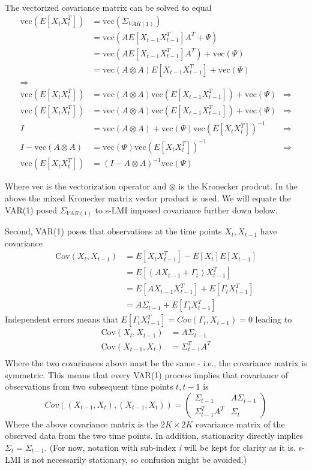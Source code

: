 \documentclass[
  letterpaper,
  DIV=11,
  numbers=noendperiod]{scrartcl}
\begin{document}
The vectorized covariance matrix can be solved to equal\\
\[
\begin{align*}
\text{vec}(E[X_tX_t^T])&=\text{vec}(\Sigma_{VAR(1)}) \\
&=\text{vec}(AE[X_{t-1}X_{t-1}^T]A^T + \Psi) \\
&=\text{vec}(AE[X_{t-1}X_{t-1}^T]A^T) + \text{vec}(\Psi) \\
&=\text{vec}(A\otimes A)E[X_{t-1}X_{t-1}^T]+\text{vec}(\Psi) \\
\Longrightarrow\\
\text{vec}(E[X_tX_t^T])&=\text{vec}(A\otimes A)\text{vec}(E[X_{t-1}X_{t-1}^T])+\text{vec}(\Psi)&\Rightarrow\\
\text{vec}(E[X_tX_t^T])&=\text{vec}(A\otimes A)\text{vec}(E[X_{t-1}X_{t-1}^T])+\text{vec}(\Psi)&\Rightarrow\\
I&=\text{vec}(A\otimes A)+\text{vec}(\Psi)\text{vec}(E[X_tX_t^T])^{-1}&\Rightarrow\\
I-\text{vec}(A\otimes A) &= \text{vec}(\Psi)\text{vec}(E[X_tX_t^T])^{-1}&\Rightarrow\\
\text{vec}(E[X_tX_t^T])&= (I-A \otimes A)^{-1} \text{vec}(\Psi)
\end{align*}
\]

Where vec is the vectorization operator and \(\otimes\) is the Kronecker
prodcut. In the above the mixed Kronecker matrix vector product is used.
We will equate the VAR(1) posed \(\Sigma_{VAR(1)}\) to s-LMI imposed
covariance further down below.

Second, VAR(1) poses that observations at the time points
\(X_t, X_{t-1}\) have covariance \[
\begin{align*}
\text{Cov}(X_t,X_{t-1})&=
E[X_tX_{t-1}^T]-E[X_t]E[X_{t-1}]\\&=
E[(AX_{t-1}+\Gamma_t)X_{t-1}^T]\\&=
E[AX_{t-1}X_{t-1}^T]+E[\Gamma_tX_{t-1}^T]\\&=
A\Sigma_{t-1}+E[\Gamma_tX_{t-1}^T]
\end{align*}
\] Independent errors means that
\(E[\Gamma_tX_{t-1}^T]=Cov(\Gamma_t,X_{t-1})=0\) leading to \[
\begin{align*}
\text{Cov}(X_t,X_{t-1})&= A\Sigma_{t-1}\\
\text{Cov}(X_{t-1},X_t)&= \Sigma_{t-1}^T A^T \\
\end{align*}
\] Where the two covariances above must be the same - i.e., the
covariance matrix is symmetric. This means that every VAR(1) process
implies that covariance of observations from two subsequent time points
\(t, t-1\) is \[
Cov((X_{t-1},X_{t}),(X_{t-1},X_{t})) = 
\begin{pmatrix} 
  \Sigma_{t-1} & A\Sigma_{t-1} \\
  \Sigma_{t-1}^TA^T & \Sigma_t
\end{pmatrix} \] Where the above covariance matrix is the
\(2K\times 2K\) covariance matrix of the observed data from the two time
points. In addition, stationarity directly implies
\(\Sigma_t=\Sigma_{t-1}\). (For now, notation with sub-index \emph{i}
will be kept for clarity as it is. s-LMI is not necessarily stationary,
so confusion might be avoided.)
\end{document}
